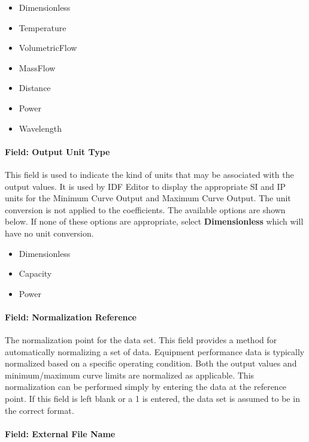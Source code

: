 \begin{itemize}
\item
  Dimensionless
\item
  Temperature
\item
  VolumetricFlow
\item
  MassFlow
\item
  Distance
\item
  Power
\item
  Wavelength
\end{itemize}

\paragraph{Field: Output Unit Type}\label{field-output-unit-type-1-000}

This field is used to indicate the kind of units that may be associated with the output values. It is used by IDF Editor to display the appropriate SI and IP units for the Minimum Curve Output and Maximum Curve Output. The unit conversion is not applied to the coefficients. The available options are shown below. If none of these options are appropriate, select \textbf{Dimensionless} which will have no unit conversion.

\begin{itemize}
\item
  Dimensionless
\item
  Capacity
\item
  Power
\end{itemize}

\paragraph{Field: Normalization Reference}\label{field-normalization-reference-1}

The normalization point for the data set. This field provides a method for automatically normalizing a set of data. Equipment performance data is typically normalized based on a specific operating condition. Both the output values and minimum/maximum curve limits are normalized as applicable. This normalization can be performed simply by entering the data at the reference point. If this field is left blank or a 1 is entered, the data set is assumed to be in the correct format.

\paragraph{Field: External File Name}\label{field-external-file-name}

